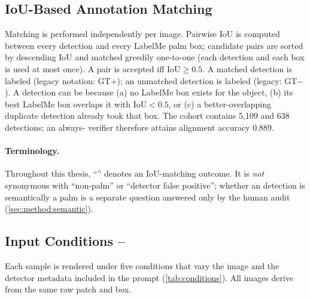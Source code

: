 \subsection{IoU-Based Annotation Matching}
\label{sec:method:iou}
Matching is performed independently per image. Pairwise IoU is computed between
every detection and every LabelMe palm box; candidate pairs are sorted by
descending IoU and matched greedily one-to-one (each detection and each box is
used at most once). A pair is accepted iff $\mathrm{IoU} \geq 0.5$.
A matched detection is labeled \emph{\matched{}} (legacy notation: GT+); an
unmatched detection is labeled \emph{\unmatched{}} (legacy: GT$-$). A detection
can be \unmatched{} because (a) no LabelMe box exists for the object, (b) its
best LabelMe box overlaps it with $\mathrm{IoU} < 0.5$, or (c) a
better-overlapping duplicate detection already took that box.
The cohort contains 5{,}109 \matched{} and 638 \unmatched{} detections; an
always-\R{} verifier therefore attains alignment accuracy 0.889.

\paragraph{Terminology.} Throughout this thesis, ``\unmatched{}'' denotes an
IoU-matching outcome. It is \emph{not} synonymous with ``non-palm'' or
``detector false positive''; whether an \unmatched{} detection is semantically a
palm is a separate question answered only by the human audit
(\cref{sec:method:semantic}).

\subsection{Input Conditions --}
\label{sec:method:conditions}
Each sample is rendered under five conditions that vary the image and the
detector metadata included in the prompt (\cref{tab:conditions}). All images
derive from the same raw patch and box.


